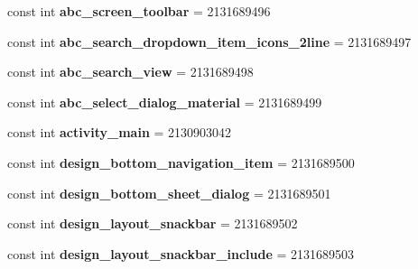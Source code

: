 \begin{DoxyCompactItemize}
const int {\bfseries abc\+\_\+screen\+\_\+toolbar} = 2131689496
\item 
\mbox{\label{classst_delivery_1_1_resource_1_1_layout_afb568688836ee72ec42c6a18ab124f83}} 
const int {\bfseries abc\+\_\+search\+\_\+dropdown\+\_\+item\+\_\+icons\+\_\+2line} = 2131689497
\item 
\mbox{\label{classst_delivery_1_1_resource_1_1_layout_acef9471d0fc3ff9f7995e942dd5920a2}} 
const int {\bfseries abc\+\_\+search\+\_\+view} = 2131689498
\item 
\mbox{\label{classst_delivery_1_1_resource_1_1_layout_a923f2d9f3587dd9c2570a5f233d05808}} 
const int {\bfseries abc\+\_\+select\+\_\+dialog\+\_\+material} = 2131689499
\item 
\mbox{\label{classst_delivery_1_1_resource_1_1_layout_ac0f63a95c79de7a34e8b37057042577f}} 
const int {\bfseries activity\+\_\+main} = 2130903042
\item 
\mbox{\label{classst_delivery_1_1_resource_1_1_layout_a18ff8ad5b691f9fa1ae62eebd512587c}} 
const int {\bfseries design\+\_\+bottom\+\_\+navigation\+\_\+item} = 2131689500
\item 
\mbox{\label{classst_delivery_1_1_resource_1_1_layout_a282220fa7f0010859d9f1880223706be}} 
const int {\bfseries design\+\_\+bottom\+\_\+sheet\+\_\+dialog} = 2131689501
\item 
\mbox{\label{classst_delivery_1_1_resource_1_1_layout_aeb34077eaaad22d9cd163778e63d4d29}} 
const int {\bfseries design\+\_\+layout\+\_\+snackbar} = 2131689502
\item 
\mbox{\label{classst_delivery_1_1_resource_1_1_layout_ab8f2e29fadbc52ce87bc79d9cfefefe7}} 
const int {\bfseries design\+\_\+layout\+\_\+snackbar\+\_\+include} = 2131689503
\item 
\mbox{\label{classst_delivery_1_1_resource_1_1_layout_a83d5d9fa4a62b160de3447d5e074ad8d}} 

\end{DoxyCompactItemize}
